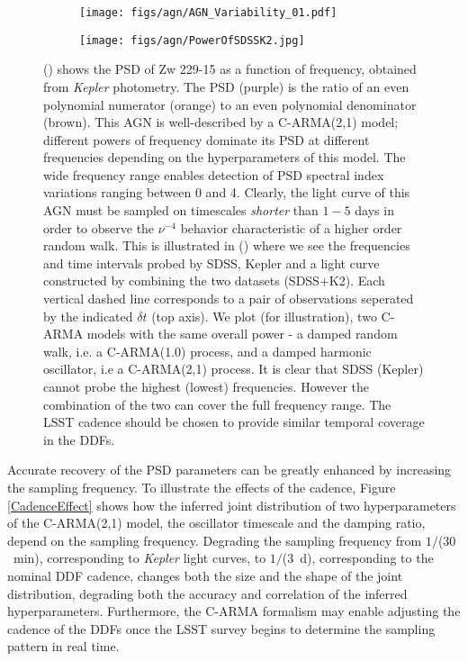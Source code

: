 \begin{figure}
  \begin{subfigure}[t]{0.5\textwidth}
    \centering\texttt{[image: figs/agn/AGN\_Variability\_01.pdf]}
    \centering
    \caption{}
    \label{fig:PSDvsFreq}
  \end{subfigure}
  \begin{subfigure}[t]{0.5\textwidth}
    \centering\texttt{[image: figs/agn/PowerOfSDSSK2.jpg]}
    \centering
    \caption{}
    \label{fig:SDSSK2Power}
  \end{subfigure}
  \caption{() shows the PSD of Zw 229-15 as a function of frequency,
  obtained from {\em Kepler} photometry. The PSD (purple) is the ratio of an even
  polynomial numerator (orange) to an even polynomial denominator (brown).
  This AGN is well-described by a C-ARMA(2,1) model; different powers of frequency
  dominate its PSD at different frequencies depending on the hyperparameters of
  this model. The wide frequency range enables detection of PSD spectral index variations
  ranging between 0 and 4. Clearly, the light curve of this AGN must be sampled on
  timescales {\em shorter} than $1-5$ days in order to observe the $\nu^{-4}$ behavior
  characteristic of a higher order random walk. This is illustrated in ()
  where we see the frequencies and time intervals probed by SDSS, Kepler and a light curve
  constructed by combining the two datasets (SDSS+K2). Each vertical dashed line corresponds to
  a pair of observations seperated by the indicated $\delta t$ (top axis). We plot (for
  illustration), two C-ARMA models with the same overall power - a damped random walk, i.e. a
  C-ARMA(1.0) process, and a damped harmonic oscillator, i.e a C-ARMA(2,1) process.
  It is clear that SDSS (Kepler) cannot probe the highest (lowest) frequencies. However the
  combination of the two can cover the full frequency range. The LSST cadence should be chosen
  to provide similar temporal coverage in the DDFs.}
  \label{PSDvsFreq}
\end{figure}

Accurate recovery of the PSD parameters can be greatly enhanced by increasing the
sampling frequency. To illustrate the effects of the cadence, Figure \ref{CadenceEffect}
shows how the inferred joint distribution of two hyperparameters of the C-ARMA(2,1)
model, the oscillator timescale and the damping ratio, depend on the sampling frequency.
Degrading the sampling frequency from $1/$($30$~min), corresponding to {\em Kepler}
light curves, to $1/$($3$~d), corresponding to the nominal DDF cadence, changes both
the size and the shape of the joint distribution, degrading both the accuracy and
correlation of the inferred hyperparameters.
%
Furthermore, the C-ARMA formalism may enable adjusting the cadence of the DDFs once
the LSST survey begins to determine the sampling pattern in real time.


